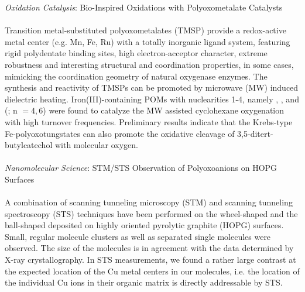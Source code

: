{\sl Oxidation Catalysis}: Bio-Inspired Oxidations with
Polyoxometalate Catalysts\\
\\
Transition metal-substituted polyoxometalates (TMSP) provide a redox-active metal center
(e.g. Mn, Fe, Ru) with a totally inorganic ligand system, featuring rigid polydentate
binding sites, high electron-acceptor character, extreme robustness and interesting
structural and coordination properties, in some cases, mimicking the coordination geometry
of natural oxygenase enzymes.  The synthesis and reactivity of TMSPs can be promoted by
microwave (MW) induced dielectric heating. Iron(III)-containing POMs with nuclearities
1-4, namely ,
,
 and
 (; n $= 4,6$) were found to catalyze the MW assisted
cyclohexane oxygenation with high turnover frequencies. Preliminary results indicate that
the Krebs-type Fe-polyoxotungstates can also promote the oxidative cleavage of
3,5-ditert-butylcatechol with molecular oxygen.\\
\\
{\sl Nanomolecular Science}: STM/STS Observation of Polyoxoanions
on HOPG Surfaces\\
\\
A combination of scanning tunneling microscopy (STM) and scanning tunneling spectroscopy
(STS) techniques have been performed on the wheel-shaped
 and the
ball-shaped
deposited on highly oriented pyrolytic graphite (HOPG) surfaces.  Small, regular molecule
clusters as well as separated single molecules were observed. The size of the molecules is
in agreement with the data determined by X-ray crystallography. In STS measurements, we
found a rather large contrast at the expected location of the Cu metal centers in our
molecules, i.e. the location of the individual Cu ions in their organic matrix is directly
addressable by STS.


